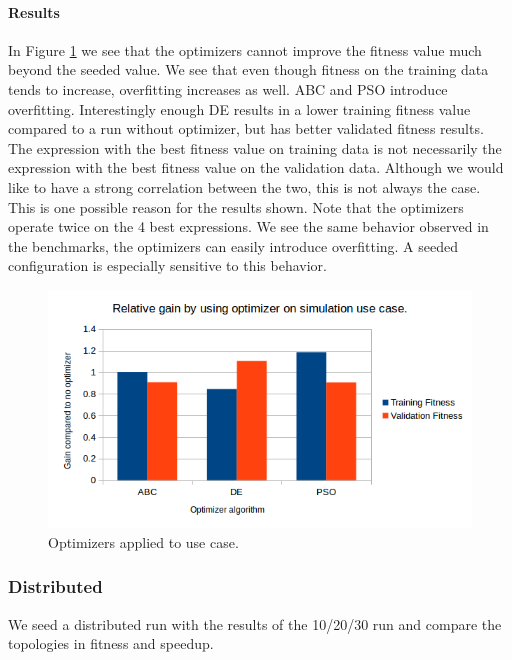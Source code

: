\paragraph{Results}
In Figure \ref{fig:usecaseoptimizers} we see that the optimizers cannot improve the fitness value much beyond the seeded value. We see that even though fitness on the training data tends to increase, overfitting increases as well. ABC and PSO introduce overfitting. Interestingly enough DE results in a lower training fitness value compared to a run without optimizer, but has better validated fitness results. The expression with the best fitness value on training data is not necessarily the expression with the best fitness value on the validation data. Although we would like to have a strong correlation between the two, this is not always the case. This is one possible reason for the results shown. Note that the optimizers operate twice on the 4 best expressions. We see the same behavior observed in the benchmarks, the optimizers can easily introduce overfitting. A seeded configuration is especially sensitive to this behavior.
\begin{figure}
    \centering
    \includegraphics[width=\textwidth,height=\textheight,keepaspectratio]{figures/usecaseoptimizers.png}
    \caption{Optimizers applied to use case.}
    \label{fig:usecaseoptimizers}
\end{figure}

\subsubsection{Distributed}
We seed a distributed run with the results of the 10/20/30 run and compare the topologies in fitness and speedup.
